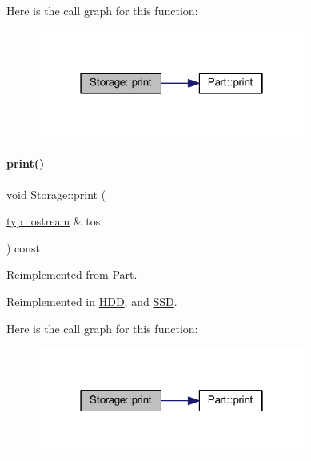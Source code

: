 Here is the call graph for this function\+:
\nopagebreak
\begin{figure}[H]
\begin{center}
\leavevmode
\includegraphics[width=250pt]{class_storage_a53fc5b4814df41517b9f2be8dcef605e_cgraph}
\end{center}
\end{figure}
\mbox{\label{class_storage_ad6c13f251a39612a7628980bf2f12918}} 
\paragraph{\texorpdfstring{print()}{print()}\hspace{0.1cm}{\footnotesize\ttfamily [4/4]}}
{\footnotesize\ttfamily void Storage\+::print (\begin{DoxyParamCaption}\item[{\mbox{\hyperlink{structtyp__ostream}{typ\+\_\+ostream}} \&}]{tos }\end{DoxyParamCaption}) const\hspace{0.3cm}{\ttfamily [virtual]}}



Reimplemented from \mbox{\hyperlink{class_part_ab6396030e8b7a724731a8b54bd4942fc}{Part}}.



Reimplemented in \mbox{\hyperlink{class_h_d_d_a557271f835f56a25fe5c264019f20bb2}{H\+DD}}, and \mbox{\hyperlink{class_s_s_d_a6e252152f8ba75043edec67e19d686e0}{S\+SD}}.

Here is the call graph for this function\+:
\nopagebreak
\begin{figure}[H]
\begin{center}
\leavevmode
\includegraphics[width=250pt]{class_storage_ad6c13f251a39612a7628980bf2f12918_cgraph}
\end{center}
\end{figure}


